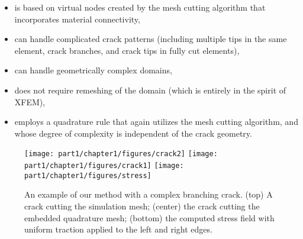 \begin{itemize}
\item is based on virtual nodes created by the mesh cutting algorithm that incorporates material connectivity,
\item can handle complicated crack patterns (including multiple tips in the same element, crack branches, and crack tips in fully cut elements),
\item can handle geometrically complex domains,
\item does not require remeshing of the domain (which is entirely in the spirit of XFEM),
\item employs a quadrature rule that again utilizes the mesh cutting algorithm, and whose degree of complexity is independent of the crack geometry.
\end{itemize}

\setlength{\figurewidth}{0.80\columnwidth}
\begin{figure}[htbp]
\begin{center}
\texttt{[image: part1/chapter1/figures/crack2]}
\texttt{[image: part1/chapter1/figures/crack1]}
\texttt{[image: part1/chapter1/figures/stress]}
\caption{An example of our method with a complex branching crack. (top) A crack cutting the simulation mesh; (center) the crack cutting the embedded quadrature mesh; (bottom) the computed stress field with uniform traction applied to the left and right edges.}
\label{fig:ch1.introexample}
\end{center}
\end{figure}

